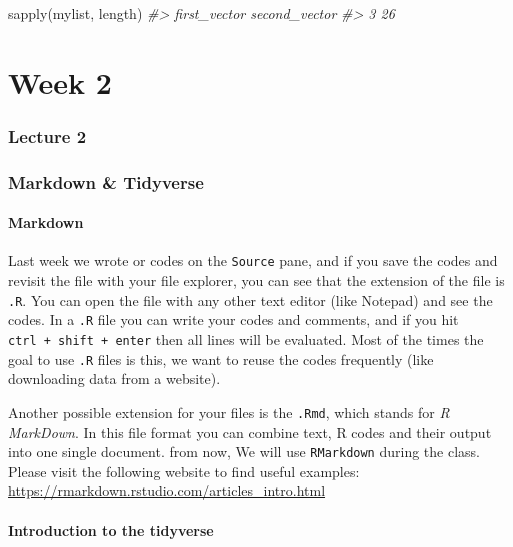 \documentclass[
]{article}
\newenvironment{Shaded}{\begin{snugshade}}{\end{snugshade}}
\newcommand{\CommentTok}[1]{\textcolor[rgb]{0.56,0.35,0.01}{\textit{#1}}}
\newcommand{\FunctionTok}[1]{\textcolor[rgb]{0.00,0.00,0.00}{#1}}
\newcommand{\NormalTok}[1]{#1}
\begin{document}
\begin{Shaded}
\begin{Highlighting}[]
\FunctionTok{sapply}\NormalTok{(mylist, length)}
\CommentTok{\#\textgreater{}  first\_vector second\_vector }
\CommentTok{\#\textgreater{}             3            26}
\end{Highlighting}
\end{Shaded}

\hypertarget{part-week-2}{%
\part*{Week 2}\label{part-week-2}}

\hypertarget{lecture2}{%
\section{Lecture 2}\label{lecture2}}

\hypertarget{seminar2}{%
\section{Markdown \& Tidyverse}\label{seminar2}}

\hypertarget{markdown}{%
\subsection{Markdown}\label{markdown}}

Last week we wrote or codes on the \texttt{Source} pane, and if you save the codes and revisit the file with your file explorer, you can see that the extension of the file is \texttt{.R}. You can open the file with any other text editor (like Notepad) and see the codes. In a \texttt{.R} file you can write your codes and comments, and if you hit \texttt{ctrl\ +\ shift\ +\ enter} then all lines will be evaluated. Most of the times the goal to use \texttt{.R} files is this, we want to reuse the codes frequently (like downloading data from a website).

Another possible extension for your files is the \texttt{.Rmd}, which stands for \emph{R MarkDown}. In this file format you can combine text, R codes and their output into one single document. from now, We will use \texttt{RMarkdown} during the class. Please visit the following website to find useful examples: \url{https://rmarkdown.rstudio.com/articles_intro.html}

\hypertarget{introduction-to-the-tidyverse}{%
\subsection{Introduction to the tidyverse}\label{introduction-to-the-tidyverse}}
\end{document}
